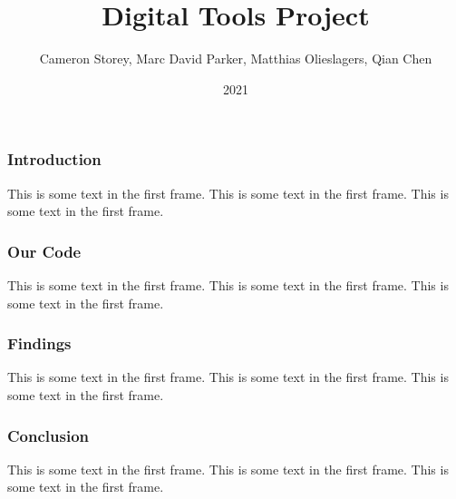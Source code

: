 \documentclass{beamer}
\title{Digital Tools Project}
\author{Cameron Storey, Marc David Parker, Matthias Olieslagers, Qian Chen}
\institute{Overleaf}
\date{2021}
\begin{document}
\frame{\titlepage}

\begin{frame}
\frametitle{Introduction}
This is some text in the first frame. This is some text in the first frame. This is some text in the first frame.
\end{frame}

\begin{frame}
    \frametitle{Our Code}
    This is some text in the first frame. This is some text in the first frame. This is some text in the first frame.
\end{frame}

\begin{frame}
    \frametitle{Findings}
    This is some text in the first frame. This is some text in the first frame. This is some text in the first frame.
\end{frame}

\begin{frame}
    \frametitle{Conclusion}
    This is some text in the first frame. This is some text in the first frame. This is some text in the first frame.
\end{frame}
\end{document}
